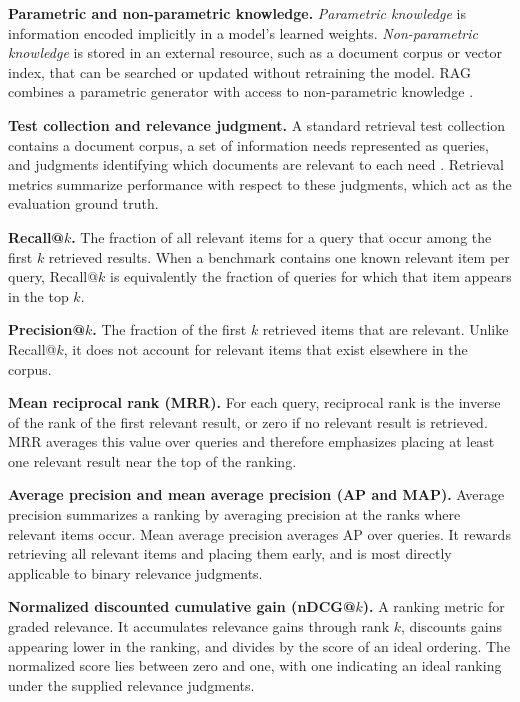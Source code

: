 \noindent\textbf{Parametric and non-parametric knowledge.}
\emph{Parametric knowledge} is information encoded implicitly in a model's
learned weights. \emph{Non-parametric knowledge} is stored in an external
resource, such as a document corpus or vector index, that can be searched or
updated without retraining the model. RAG combines a parametric generator with
access to non-parametric knowledge .

\noindent\textbf{Test collection and relevance judgment.}
A standard retrieval test collection contains a document corpus, a set of
information needs represented as queries, and judgments identifying which
documents are relevant to each need .
Retrieval metrics summarize performance with respect to these judgments, which
act as the evaluation ground truth.

\noindent\textbf{Recall@$k$.}
The fraction of all relevant items for a query that occur among the first $k$
retrieved results. When a benchmark contains one known relevant item per query,
Recall@$k$ is equivalently the fraction of queries for which that item appears
in the top $k$.

\noindent\textbf{Precision@$k$.}
The fraction of the first $k$ retrieved items that are relevant. Unlike
Recall@$k$, it does not account for relevant items that exist elsewhere in the
corpus.

\noindent\textbf{Mean reciprocal rank (MRR).}
For each query, reciprocal rank is the inverse of the rank of the first relevant
result, or zero if no relevant result is retrieved. MRR averages this value over
queries and therefore emphasizes placing at least one relevant result near the
top of the ranking.

\noindent\textbf{Average precision and mean average precision (AP and MAP).}
Average precision summarizes a ranking by averaging precision at the ranks
where relevant items occur. Mean average precision averages AP over queries. It
rewards retrieving all relevant items and placing them early, and is most
directly applicable to binary relevance judgments.

\noindent\textbf{Normalized discounted cumulative gain (nDCG@$k$).}
A ranking metric for graded relevance. It accumulates relevance gains through
rank $k$, discounts gains appearing lower in the ranking, and divides by the
score of an ideal ordering. The normalized score lies between zero and one,
with one indicating an ideal ranking under the supplied relevance judgments.

